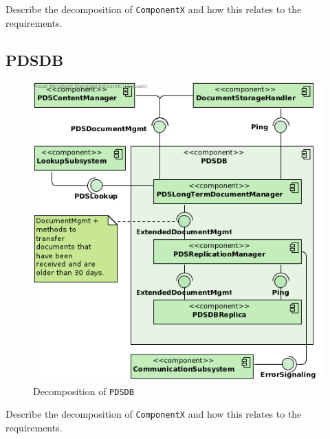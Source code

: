 Describe the decomposition of \texttt{ComponentX} and how this relates to the
requirements.

\subsection{PDSDB}
\begin{figure}[!htp]
    \centering
    \includegraphics[width=\textwidth]{figures/PDSDB.png}
    \caption{Decomposition of \texttt{PDSDB}}\label{fig:decomp-pdsdb}
\end{figure}

Describe the decomposition of \texttt{ComponentX} and how this relates to the
requirements.

